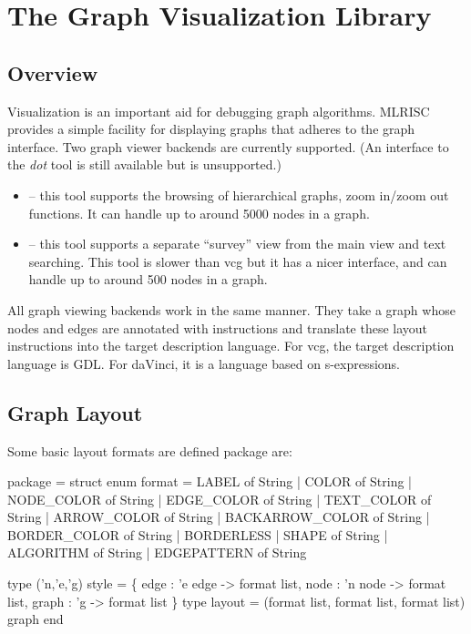 \section{The Graph Visualization Library}
\subsection{Overview}
Visualization is an important aid for debugging graph algorithms.
MLRISC provides a simple facility for displaying graphs that
adheres to the graph interface.  Two graph viewer 
backends are currently supported.  (An interface to the \emph{dot}
tool is still available but is unsupported.)
\begin{itemize}
 \item {} -- 
     this tool supports the browsing
 of hierarchical graphs, zoom in/zoom out functions.  It can
 handle up to around 5000 nodes in a graph.
 \item {} -- 
   this tool supports a separate
 ``survey'' view from the main view and text searching.  This tool is
slower than vcg but it has a nicer interface, and
 can handle up to around 500 nodes in a graph.
\end{itemize}
All graph viewing backends work in the same manner.  
They take a graph whose nodes and edges are annotated with 
instructions and translate these layout instructions
into the target description language.  For vcg, the target description
language is GDL.  For daVinci, it is a language based on s-expressions.

\subsection{Graph Layout}
Some basic layout formats are defined package  are:
\begin{SML}
 package  = struct
   enum format =
     LABEL of String
   | COLOR of String
   | NODE_COLOR of String
   | EDGE_COLOR of String
   | TEXT_COLOR of String
   | ARROW_COLOR of String
   | BACKARROW_COLOR of String
   | BORDER_COLOR of String
   | BORDERLESS 
   | SHAPE of String 
   | ALGORITHM of String
   | EDGEPATTERN of String

   type ('n,'e,'g) style = 
      \{ edge  : 'e edge -> format list,
        node  : 'n node -> format list,
        graph : 'g -> format list
      \}
   type layout = (format list, format list, format list) graph
 end
\end{SML}

